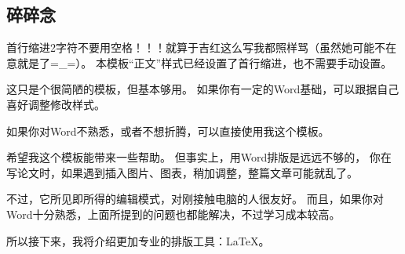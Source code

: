 \subsection{碎碎念}
首行缩进2字符不要用空格！！！就算于吉红这么写我都照样骂（虽然她可能不在意就是了=\_=）。
本模板“正文”样式已经设置了首行缩进，也不需要手动设置。

这只是个很简陋的模板，但基本够用。
如果你有一定的Word基础，可以跟据自己喜好调整修改样式。

如果你对Word不熟悉，或者不想折腾，可以直接使用我这个模板。

希望我这个模板能带来一些帮助。
但事实上，用Word排版是远远不够的，
你在写论文时，如果遇到插入图片、图表，稍加调整，整篇文章可能就乱了。

不过，它所见即所得的编辑模式，对刚接触电脑的人很友好。
而且，如果你对Word十分熟悉，上面所提到的问题也都能解决，不过学习成本较高。

所以接下来，我将介绍更加专业的排版工具：\LaTeX。